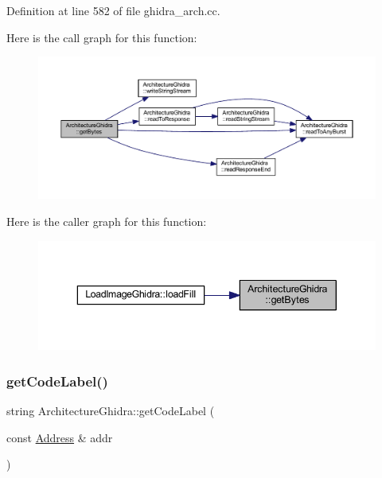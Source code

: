Definition at line 582 of file ghidra\+\_\+arch.\+cc.

Here is the call graph for this function\+:
\nopagebreak
\begin{figure}[H]
\begin{center}
\leavevmode
\includegraphics[width=350pt]{class_architecture_ghidra_a466a3f9dfecdbaacfae1dd93e7d5d3a6_cgraph}
\end{center}
\end{figure}
Here is the caller graph for this function\+:
\nopagebreak
\begin{figure}[H]
\begin{center}
\leavevmode
\includegraphics[width=343pt]{class_architecture_ghidra_a466a3f9dfecdbaacfae1dd93e7d5d3a6_icgraph}
\end{center}
\end{figure}
\mbox{\label{class_architecture_ghidra_ad66f093e36881a04b3dd40971373ce9e}} 
\subsubsection{\texorpdfstring{getCodeLabel()}{getCodeLabel()}}
{\footnotesize\ttfamily string Architecture\+Ghidra\+::get\+Code\+Label (\begin{DoxyParamCaption}\item[{const \mbox{\hyperlink{class_address}{Address}} \&}]{addr }\end{DoxyParamCaption})}



